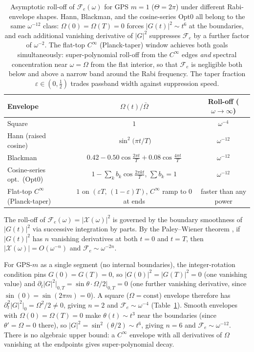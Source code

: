 \documentclass[aps,pra,twocolumn,superscriptaddress,longbibliography]{revtex4-2}
\begin{document}
\begin{table}[t]
\centering
\begin{tabular}{lcc}
\toprule
Envelope & $\Omega(t)/\bar\Omega$ & Roll-off ($\omega\to\infty$) \\
\midrule
Square & $1$ & $\omega^{-4}$ \\
Hann (raised cosine) & $\sin^2\!\bigl(\pi t/T\bigr)$ & $\omega^{-12}$ \\
Blackman & $0.42 - 0.50\cos\!\tfrac{2\pi t}{T} + 0.08\cos\!\tfrac{4\pi t}{T}$ & $\omega^{-12}$ \\
Cosine-series opt.\ (Opt0) & $1 - {\textstyle\sum_k} b_k\cos\!\tfrac{2\pi k t}{T}$,\; $\sum b_k=1$ & $\omega^{-12}$ \\
Flat-top $C^\infty$ (Planck-taper) & $1$ on $({\varepsilon T},\,(1{-}\varepsilon)T)$, $C^\infty$ ramp to $0$ at ends & faster than any power \\
\bottomrule
\end{tabular}
\caption{%
  Asymptotic roll-off of $\mathcal{F}_e(\omega)$ for GPS $m=1$ ($\Theta=2\pi$)
  under different Rabi-envelope shapes.
  Hann, Blackman, and the cosine-series Opt0 all belong to the same
  $\omega^{-12}$ class: $\Omega(0)=\Omega(T)=0$ forces $|G(t)|^2\!\sim t^6$
  at the boundaries, and each additional vanishing derivative of $|G|^2$
  suppresses $\mathcal{F}_e$ by a further factor of $\omega^{-2}$.
  The flat-top $C^\infty$ (Planck-taper) window achieves both goals
  simultaneously: super-polynomial roll-off from the $C^\infty$ edges
  \emph{and} spectral concentration near $\omega=\Omega$ from the flat
  interior, so that $\mathcal{F}_e$ is negligible both below and above a
  narrow band around the Rabi frequency.
  The taper fraction $\varepsilon\in(0,\tfrac{1}{2})$ trades passband
  width against suppression speed.%
}
\label{tab:rolloff}
\end{table}

The roll-off of $\mathcal{F}_e(\omega) = |\mathcal{X}(\omega)|^2$ is governed by the
boundary smoothness of $|G(t)|^2$ via successive integration by parts.
By the Paley--Wiener theorem \cite{Katznelson2004}, if $|G(t)|^2$ has $n$ vanishing
derivatives at both $t=0$ and $t=T$, then
$|\mathcal{X}(\omega)| = O(\omega^{-n})$ and $\mathcal{F}_e \sim \omega^{-2n}$.

For GPS-$m$ as a single segment (no internal boundaries), the integer-rotation condition
pins $G(0)=G(T)=0$, so $|G(0)|^2=|G(T)|^2=0$ (one vanishing value) and
$\partial_t|G|^2\big|_{0,T}=\sin\theta\cdot\Omega/2\big|_{0,T}=0$ (one further vanishing
derivative, since $\sin(0)=\sin(2\pi m)=0$).
A square ($\Omega=\text{const}$) envelope therefore has
$\partial_t^2|G|^2\big|_0 = \Omega^2/2 \neq 0$, giving $n=2$ and
$\mathcal{F}_e\sim\omega^{-4}$ (Table~\ref{tab:rolloff}).
Smooth envelopes with $\Omega(0)=\Omega(T)=0$ make $\theta(t)\sim t^3$ near the boundaries
(since $\theta'=\Omega=0$ there), so $|G|^2 = \sin^2(\theta/2)\sim t^6$, giving $n=6$ and
$\mathcal{F}_e\sim\omega^{-12}$.
There is no algebraic upper bound: a $C^\infty$ envelope with all derivatives of $\Omega$
vanishing at the endpoints gives super-polynomial decay.
\end{document}
